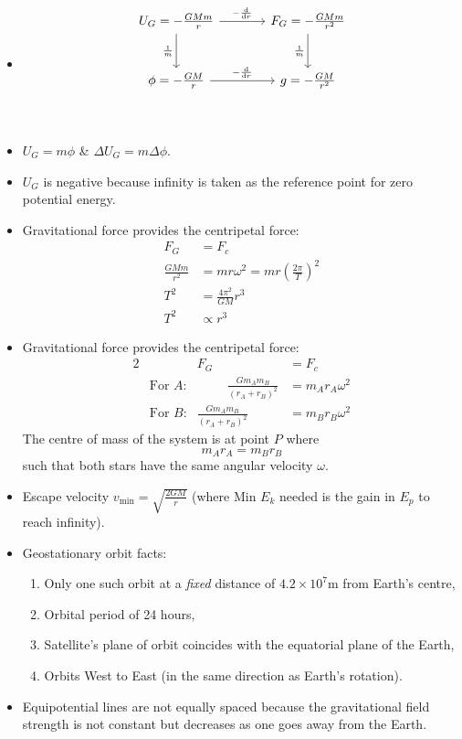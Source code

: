 \documentclass[oneside]{book}
\begin{document}
\begin{itemize}[label=\(\square\)]
    \item \[
\begin{tikzcd}[row sep=large, column sep=large]
     U_G=-\frac{GMm}{r} \arrow{r}{-\frac{\text{d}}{\text{d}r}} \arrow[swap]{d}{\frac{1}{m}} & F_G=-\frac{GMm}{r^2} \arrow[swap]{d}{\frac{1}{m}} \\
     \phi=-\frac{GM}{r} \arrow{r}{-\frac{\text{d}}{\text{d}r}} & g=-\frac{GM}{r^2}\\
\end{tikzcd}
\]
\item \(U_G=m\phi\) \& \(\Delta U_G=m\Delta\phi\).
\item \(U_G\) is negative because infinity is taken as the reference point for zero potential energy.
\item Gravitational force provides the centripetal force:
\begin{align*}
    F_G&=F_c\\
    \frac{GMm}{r^2}&=mr\omega^2=mr\left(\frac{2\pi}{T}\right)^2\\
    T^2&=\frac{4\pi^2}{GM}r^3\\
    T^2 &\propto r^3
\end{align*}
\item Gravitational force provides the centripetal force:
\begin{alignat*}{2}
    && F_G&=F_c\\
    &\text{For \(A\):}& \hspace{1cm} \frac{Gm_Am_B}{(r_A+r_B)^2}&=m_Ar_A\omega^2\\
    &\text{For \(B\):}& \frac{Gm_Am_B}{(r_A+r_B)^2}&=m_Br_B\omega^2
\end{alignat*}
The centre of mass of the system is at point \(P\) where 
\[m_Ar_A=m_Br_B\]
such that both stars have the same angular velocity \(\omega\).
\item Escape velocity \(v_\text{min}=\sqrt{\frac{2GM}{r}}\) (where Min \(E_k\) needed is the gain in \(E_p\) to reach infinity).
\item Geostationary orbit facts:
\begin{enumerate}
    \item Only one such orbit at a \emph{fixed} distance of \(4.2\times10^7\text{m}\) from Earth's centre,
    \item Orbital period of 24 hours,
    \item Satellite's plane of orbit coincides with the equatorial plane of the Earth,
    \item Orbits West to East (in the same direction as Earth's rotation). 
\end{enumerate}
\item Equipotential lines are not equally spaced because the gravitational field strength is not constant but decreases as one goes away from the Earth.
\end{itemize}
\end{document}
